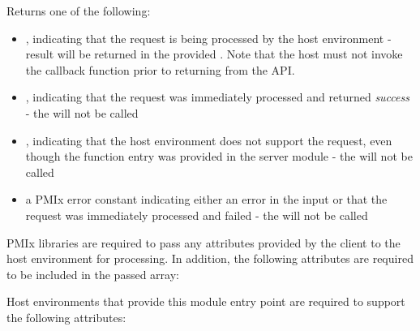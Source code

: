 \begin{arglist}
\end{arglist}

Returns one of the following:

\begin{itemize}
    \item {}, indicating that the request is being processed by the host environment - result will be returned in the provided . Note that the host must not invoke the callback function prior to returning from the \ac{API}.
    \item {}, indicating that the request was immediately processed and returned \textit{success} - the  will not be called
    \item {}, indicating that the host environment does not support the request, even though the function entry was provided in the server module - the  will not be called
    \item a PMIx error constant indicating either an error in the input or that the request was immediately processed and failed - the  will not be called
\end{itemize}

\reqattrstart
\ac{PMIx} libraries are required to pass any attributes provided by the client to the host environment for processing. In addition, the following attributes are required to be included in the passed  array:


\divider

Host environments that provide this module entry point are required to support the following attributes:


